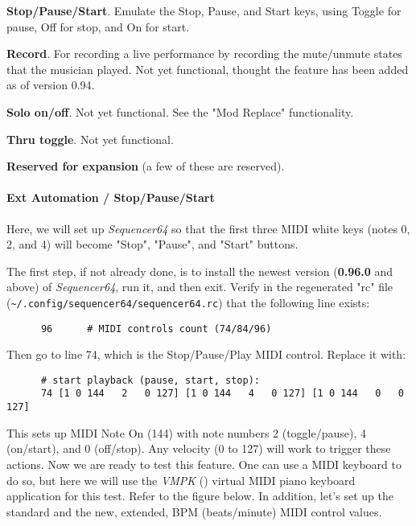       \begin{enumber}
         \item \textbf{Stop/Pause/Start}.  Emulate the Stop, Pause, and
            Start keys, using Toggle for pause, Off for stop, and On for
            start.
         \item \textbf{Record}.  For recording a live performance by
            recording the mute/unmute states that the musician played.
            Not yet functional, thought the feature has been added as of
            version 0.94.
         \item \textbf{Solo on/off}.
            Not yet functional.  See the "Mod Replace" functionality.
         \item \textbf{Thru toggle}.
            Not yet functional.
         \item \textbf{Reserved for expansion} (a few of these are reserved).
      \end{enumber}

\paragraph{Ext Automation / Stop/Pause/Start}
\label{paragraph:seq64_rc_file_midi_ctrl_ex_stopps}

   Here, we will set up \textsl{Sequencer64} so that the first three MIDI
   white keys (notes 0, 2, and 4) will become "Stop", "Pause", and "Start"
   buttons.

   The first step, if not already done, is to install the newest version
   (\textbf{0.96.0} and above) of \textsl{Sequencer64},
   run it, and then exit.
   Verify in the regenerated "rc" file
   (\texttt{\textasciitilde/.config/sequencer64/sequencer64.rc}) that the
   following line exists:

   \begin{verbatim}
      96      # MIDI controls count (74/84/96)
   \end{verbatim}

   Then go to line 74, which is the Stop/Pause/Play MIDI control.
   Replace it with:

   \begin{verbatim}
      # start playback (pause, start, stop):
      74 [1 0 144   2   0 127] [1 0 144   4   0 127] [1 0 144   0   0 127]
   \end{verbatim}

   This sets up MIDI Note On (144) with note numbers 2 (toggle/pause),
   4 (on/start), and 0 (off/stop).
   Any velocity (0 to 127) will work to trigger these actions.
   Now we are ready to test this feature.  One can use a MIDI keyboard to do
   so, but here we will use the \textsl{VMPK} (\cite{vmpk}) virtual MIDI
   piano keyboard application for this test.  Refer to the figure below.
   In addition, let's set up the standard and the new, extended, BPM
   (beats/minute) MIDI control values.  

